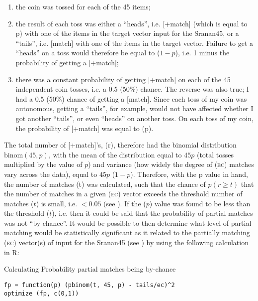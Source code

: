 {{{{{{{{{\begin{enumerate}
\item {the coin was tossed for each of the 45 items;}
\item{the result of each toss was either a ``heads'', i.e. [+match] (which is equal to p) with one of the items in the target vector input for the Sranan45, or a ``tails'', i.e. [\textminus{}match] with one of the items in the target vector. Failure to get a ``heads'' on a toss would therefore be equal to ($1-p$), i.e. 1 minus the probability of getting a [+match];}
\item{there was a constant probability of getting [+match] on each of the 45 independent coin tosses, i.e. a 0.5 (50\%) chance. The reverse was also true; I had a 0.5 (50\%) chance of getting a [\textminus{}match]. Since each toss of my coin was autonomous, getting a ``tails'', for example, would not have affected whether I got another ``tails'', or even ``heads'' on another toss. On each toss of my coin, the probability of [+match] was equal to (p).}
\end{enumerate}

The total number of [+match]'s, (r), therefore had the binomial distribution $\text{binom} (45, p)$, with the mean of the distribution equal to $45p$ (total tosses multiplied by the value of $p$) and variance (how widely the degree of (\textsc{ec}) matches vary across the data), equal to $45p$ ($1-p$). Therefore, with the p value in hand, the number of matches (t) was calculated, such that the chance of $p(r \geq t)$ that the number of matches in a given (\textsc{ec}) vector exceeds the threshold number of matches ($t$) is small, i.e. $<0.05$ (see ). If the ($p$) value was found to be less than the threshold ($t$), i.e. then it could be said that the probability of partial matches was not ``by-chance''. It would be possible to then determine what level of partial matching would be statistically significant as it related to the partially matching (\textsc{ec}) vector(s) of input for the Sranan45 (see ) by using the following calculation in R:

% 
\ea
\label{exTable 3.13}
{Calculating Probability partial matches being by-chance}\\
\begin{lstlisting}
fp = function(p) (pbinom(t, 45, p) - tails/ec)^2
optimize (fp, c(0,1))
\end{lstlisting}
\z

}}}}}}}}}
